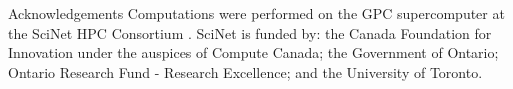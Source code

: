\begin{section}{Acknowledgements}
  \label{sec:acknowledgements}
Computations were performed on the GPC supercomputer at the SciNet HPC Consortium \cite{bib:Loken}. SciNet is funded by: the Canada Foundation for Innovation under the auspices of Compute Canada; the Government of Ontario; Ontario Research Fund - Research Excellence; and the University of Toronto.
\end{section}
